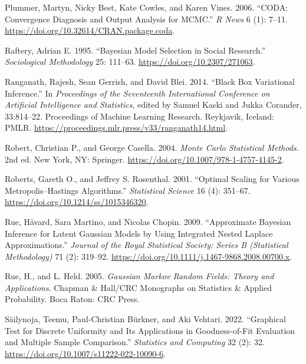 \documentclass[
  11pt,
  letterpaper,
]{scrbook}
\newlength{\cslhangindent}
\newenvironment{CSLReferences}[2] %
 {\begin{list}{}{%
  \setlength{\itemindent}{0pt}
  \setlength{\leftmargin}{0pt}
  \setlength{\parsep}{0pt}
  \ifodd #1
   \setlength{\leftmargin}{\cslhangindent}
   \setlength{\itemindent}{-1\cslhangindent}
  \fi
  \setlength{\itemsep}{#2\baselineskip}}}
 {\end{list}}
\theoremstyle{definition}
\theoremstyle{definition}
\theoremstyle{definition}
\theoremstyle{plain}
\theoremstyle{plain}
\theoremstyle{plain}
\theoremstyle{remark}
\begin{document}
\begin{CSLReferences}{1}{0}
Plummer, Martyn, Nicky Best, Kate Cowles, and Karen Vines. 2006.
{``{CODA}: Convergence Diagnosis and Output Analysis for {MCMC}.''}
\emph{R News} 6 (1): 7--11.
\url{https://doi.org/10.32614/CRAN.package.coda}.

Raftery, Adrian E. 1995. {``Bayesian Model Selection in Social
Research.''} \emph{Sociological Methodology} 25: 111--63.
\url{https://doi.org/10.2307/271063}.

Ranganath, Rajesh, Sean Gerrish, and David Blei. 2014. {``{Black Box
Variational Inference}.''} In \emph{Proceedings of the Seventeenth
International Conference on Artificial Intelligence and Statistics},
edited by Samuel Kaski and Jukka Corander, 33:814--22. Proceedings of
Machine Learning Research. Reykjavik, Iceland: PMLR.
\url{https://proceedings.mlr.press/v33/ranganath14.html}.

Robert, Christian P., and George Casella. 2004. \emph{{M}onte {C}arlo
Statistical Methods}. 2nd ed. New York, NY: Springer.
\url{https://doi.org/10.1007/978-1-4757-4145-2}.

Roberts, Gareth O., and Jeffrey S. Rosenthal. 2001. {``Optimal Scaling
for Various {M}etropolis--{H}astings Algorithms.''} \emph{Statistical
Science} 16 (4): 351--67. \url{https://doi.org/10.1214/ss/1015346320}.

Rue, Håvard, Sara Martino, and Nicolas Chopin. 2009. {``Approximate
Bayesian Inference for Latent {G}aussian Models by Using Integrated
Nested {L}aplace Approximations.''} \emph{Journal of the Royal
Statistical Society: Series B (Statistical Methodology)} 71 (2):
319--92. \url{https://doi.org/10.1111/j.1467-9868.2008.00700.x}.

Rue, H., and L. Held. 2005. \emph{{G}aussian {M}arkov Random Fields:
Theory and Applications}. Chapman \& Hall/CRC Monographs on Statistics
\& Applied Probability. Boca Raton: CRC Press.

Säilynoja, Teemu, Paul-Christian Bürkner, and Aki Vehtari. 2022.
{``Graphical Test for Discrete Uniformity and Its Applications in
Goodness-of-Fit Evaluation and Multiple Sample Comparison.''}
\emph{Statistics and Computing} 32 (2): 32.
\url{https://doi.org/10.1007/s11222-022-10090-6}.


\end{CSLReferences}
\end{document}
